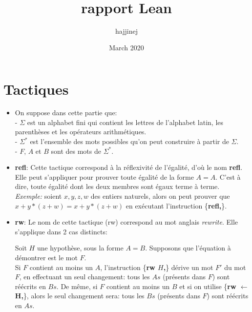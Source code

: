 \documentclass{article}
\title{rapport Lean}
\author{hajjinej }
\date{March 2020}
\begin{document}
\maketitle

\section{Tactiques}
\begin{itemize}
    \item On suppose dans cette partie que:\\ - $\Sigma$ est un alphabet fini qui contient les lettres de l'alphabet latin, les parenthèses et les opérateurs arithmétiques.\\
    - $\Sigma^*$ est l'ensemble des mots possibles qu'on peut construire à partir de $\Sigma$.\\
    - $F$, $A$ et $B$ sont des mots de $\Sigma^*$.
    \item {\large \textbf{refl}}: Cette tactique correspond à la réflexivité de l'égalité, d'où le nom \textbf{refl}. Elle peut s'appliquer pour prouver toute égalité de la forme $A=A$. C'est à dire, toute égalité dont les deux membres sont égaux terme à terme. \\
    \textit{Exemple:} soient $x,y,z,w$ des entiers naturels, alors on peut prouver que $x+y*(z+w)=x+y*(z+w)$ en exécutant l'instruction \big\{\textbf{refl,}\big\}.
    \item {\large\textbf{rw}}: Le nom de cette tactique (rw) correspond au mot anglais \textit{rewrite}. Elle s'applique dans 2 cas distincts:
    
     \hspace{1cm} Soit $H$ une hypothèse, sous la forme $A=B$. 
    Supposons que l'équation à démontrer est le mot $F$. \\Si $F$ contient au moins un $A$, l'instruction \big\{\textbf{rw $H$,}\big\} dérive un mot $F'$ du mot $F$, en effectuant un seul changement: tous les $As$ (présents dans $F$) sont réécrits en $Bs$. De même, si $F$ contient au moins un $B$ et si on utilise \big\{\textbf{rw $\leftarrow$ H,}\big\}, alors le seul changement sera: tous les $Bs$ (présents dans $F$) sont réécrits en $As$.
    

\end{itemize}
\end{document}
